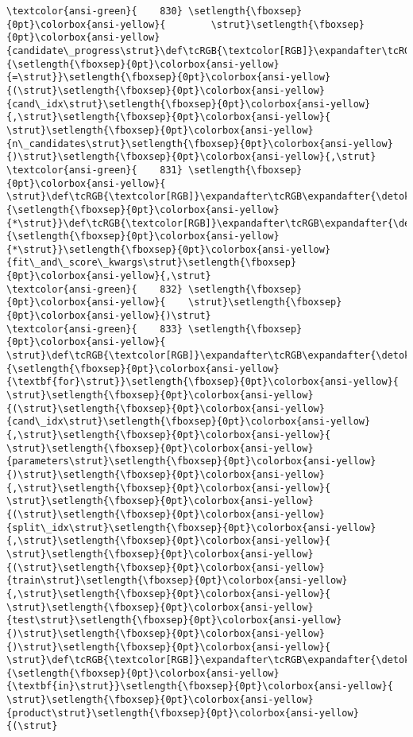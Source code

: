 \documentclass[11pt]{article}
\begin{document}
\begin{Verbatim}[commandchars=\\\{\}, frame=single, framerule=2mm, rulecolor=\color{outerrorbackground}]
\textcolor{ansi-green}{    830} \setlength{\fboxsep}{0pt}\colorbox{ansi-yellow}{        \strut}\setlength{\fboxsep}{0pt}\colorbox{ansi-yellow}{candidate\_progress\strut}\def\tcRGB{\textcolor[RGB]}\expandafter\tcRGB\expandafter{\detokenize{98,98,98}}{\setlength{\fboxsep}{0pt}\colorbox{ansi-yellow}{=\strut}}\setlength{\fboxsep}{0pt}\colorbox{ansi-yellow}{(\strut}\setlength{\fboxsep}{0pt}\colorbox{ansi-yellow}{cand\_idx\strut}\setlength{\fboxsep}{0pt}\colorbox{ansi-yellow}{,\strut}\setlength{\fboxsep}{0pt}\colorbox{ansi-yellow}{ \strut}\setlength{\fboxsep}{0pt}\colorbox{ansi-yellow}{n\_candidates\strut}\setlength{\fboxsep}{0pt}\colorbox{ansi-yellow}{)\strut}\setlength{\fboxsep}{0pt}\colorbox{ansi-yellow}{,\strut}
\textcolor{ansi-green}{    831} \setlength{\fboxsep}{0pt}\colorbox{ansi-yellow}{        \strut}\def\tcRGB{\textcolor[RGB]}\expandafter\tcRGB\expandafter{\detokenize{98,98,98}}{\setlength{\fboxsep}{0pt}\colorbox{ansi-yellow}{*\strut}}\def\tcRGB{\textcolor[RGB]}\expandafter\tcRGB\expandafter{\detokenize{98,98,98}}{\setlength{\fboxsep}{0pt}\colorbox{ansi-yellow}{*\strut}}\setlength{\fboxsep}{0pt}\colorbox{ansi-yellow}{fit\_and\_score\_kwargs\strut}\setlength{\fboxsep}{0pt}\colorbox{ansi-yellow}{,\strut}
\textcolor{ansi-green}{    832} \setlength{\fboxsep}{0pt}\colorbox{ansi-yellow}{    \strut}\setlength{\fboxsep}{0pt}\colorbox{ansi-yellow}{)\strut}
\textcolor{ansi-green}{    833} \setlength{\fboxsep}{0pt}\colorbox{ansi-yellow}{    \strut}\def\tcRGB{\textcolor[RGB]}\expandafter\tcRGB\expandafter{\detokenize{0,135,0}}{\setlength{\fboxsep}{0pt}\colorbox{ansi-yellow}{\textbf{for}\strut}}\setlength{\fboxsep}{0pt}\colorbox{ansi-yellow}{ \strut}\setlength{\fboxsep}{0pt}\colorbox{ansi-yellow}{(\strut}\setlength{\fboxsep}{0pt}\colorbox{ansi-yellow}{cand\_idx\strut}\setlength{\fboxsep}{0pt}\colorbox{ansi-yellow}{,\strut}\setlength{\fboxsep}{0pt}\colorbox{ansi-yellow}{ \strut}\setlength{\fboxsep}{0pt}\colorbox{ansi-yellow}{parameters\strut}\setlength{\fboxsep}{0pt}\colorbox{ansi-yellow}{)\strut}\setlength{\fboxsep}{0pt}\colorbox{ansi-yellow}{,\strut}\setlength{\fboxsep}{0pt}\colorbox{ansi-yellow}{ \strut}\setlength{\fboxsep}{0pt}\colorbox{ansi-yellow}{(\strut}\setlength{\fboxsep}{0pt}\colorbox{ansi-yellow}{split\_idx\strut}\setlength{\fboxsep}{0pt}\colorbox{ansi-yellow}{,\strut}\setlength{\fboxsep}{0pt}\colorbox{ansi-yellow}{ \strut}\setlength{\fboxsep}{0pt}\colorbox{ansi-yellow}{(\strut}\setlength{\fboxsep}{0pt}\colorbox{ansi-yellow}{train\strut}\setlength{\fboxsep}{0pt}\colorbox{ansi-yellow}{,\strut}\setlength{\fboxsep}{0pt}\colorbox{ansi-yellow}{ \strut}\setlength{\fboxsep}{0pt}\colorbox{ansi-yellow}{test\strut}\setlength{\fboxsep}{0pt}\colorbox{ansi-yellow}{)\strut}\setlength{\fboxsep}{0pt}\colorbox{ansi-yellow}{)\strut}\setlength{\fboxsep}{0pt}\colorbox{ansi-yellow}{ \strut}\def\tcRGB{\textcolor[RGB]}\expandafter\tcRGB\expandafter{\detokenize{175,0,255}}{\setlength{\fboxsep}{0pt}\colorbox{ansi-yellow}{\textbf{in}\strut}}\setlength{\fboxsep}{0pt}\colorbox{ansi-yellow}{ \strut}\setlength{\fboxsep}{0pt}\colorbox{ansi-yellow}{product\strut}\setlength{\fboxsep}{0pt}\colorbox{ansi-yellow}{(\strut}

\end{Verbatim}
\end{document}
